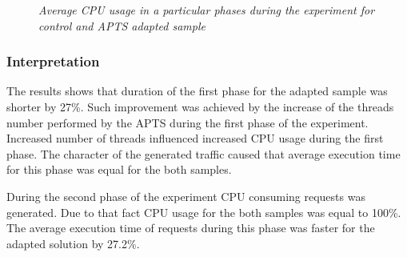 \documentclass[12pt,a4paper]{article}
\begin{document}
\mydata
\begin{figure}[!htb]
\centering
{}
\caption{\textit{Average CPU usage in a particular phases during the experiment for control and APTS adapted sample}} \label{figure:threads:results:cpu}
\end{figure}


\subsubsection{Interpretation} 

The results shows that duration of the first phase for the adapted sample was shorter by 27\%. Such improvement was achieved by the increase of the threads number performed by the APTS during the first phase of the experiment. Increased number of threads influenced increased CPU usage during the first phase. The character of the generated traffic caused that average execution time for this phase was equal for the both samples. 

During the second phase of the experiment CPU consuming requests was generated. Due to that fact CPU usage for the both samples was equal to 100\%. The average execution time of requests during this phase was faster for the adapted solution by 27.2\%. 
\end{document}
